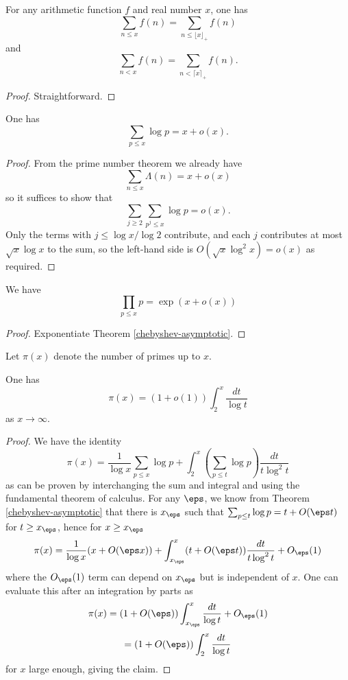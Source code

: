 
\begin{lemma}\label{range-eq-range}\leanok For any arithmetic function $f$ and real number $x$, one has
$$ \sum_{n \leq x} f(n) = \sum_{n \leq ⌊x⌋_+} f(n)$$
and
$$ \sum_{n < x} f(n) = \sum_{n < ⌈x⌉_+} f(n).$$
\end{lemma}


\begin{proof}\leanok Straightforward. \end{proof}


\begin{theorem}\label{chebyshev-asymptotic}\leanok  One has
  $$ \sum_{p \leq x} \log p = x + o(x).$$
\end{theorem}


\begin{proof}
From the prime number theorem we already have
$$ \sum_{n \leq x} \Lambda(n) = x + o(x)$$
so it suffices to show that
$$ \sum_{j \geq 2} \sum_{p^j \leq x} \log p = o(x).$$
Only the terms with $j \leq \log x / \log 2$ contribute, and each $j$ contributes at most $\sqrt{x} \log x$ to the sum, so the left-hand side is $O( \sqrt{x} \log^2 x ) = o(x)$ as required.
\end{proof}


\begin{corollary}  \label{primorial-bounds}\leanok
We have
  $$ \prod_{p \leq x} p = \exp( x + o(x) )$$
\end{corollary}


\begin{proof}
  Exponentiate Theorem \ref{chebyshev-asymptotic}.
\end{proof}


Let $\pi(x)$ denote the number of primes up to $x$.

\begin{theorem}\label{pi-asymp}\leanok  One has
  $$ \pi(x) = (1+o(1)) \int_2^x \frac{dt}{\log t}$$
as $x \to \infty$.
\end{theorem}


\begin{proof}
We have the identity
$$ \pi(x) = \frac{1}{\log x} \sum_{p \leq x} \log p
+ \int_2^x (\sum_{p \leq t} \log p) \frac{dt}{t \log^2 t}$$
as can be proven by interchanging the sum and integral and using the fundamental theorem of calculus.  For any $\eps$, we know from Theorem \ref{chebyshev-asymptotic} that there is $x_\eps$ such that
$\sum_{p \leq t} \log p = t + O(\eps t)$ for $t \geq x_\eps$, hence for $x \geq x_\eps$
$$ \pi(x) = \frac{1}{\log x} (x + O(\eps x))
+ \int_{x_\eps}^x (t + O(\eps t)) \frac{dt}{t \log^2 t} + O_\eps(1)$$
where the $O_\eps(1)$ term can depend on $x_\eps$ but is independent of $x$.  One can evaluate this after an integration by parts as
$$ \pi(x) = (1+O(\eps)) \int_{x_\eps}^x \frac{dt}{\log t} + O_\eps(1)$$
$$  = (1+O(\eps)) \int_{2}^x \frac{dt}{\log t} $$
for $x$ large enough, giving the claim.
\end{proof}


